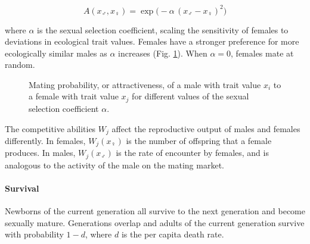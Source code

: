 \begin{equation}
    A(x_{\male}, x_{\female}) = \exp{\big(-\alpha \, (x_{\male} - x_{\female})^2\big)}
    \label{eq:assortative_mating}
\end{equation}

where $\alpha$ is the sexual selection coefficient, scaling the sensitivity of females to deviations in ecological trait values. Females have a stronger preference for more ecologically similar males as $\alpha$ increases (Fig. \ref{fig:mating_probability}). When $\alpha = 0$, females mate at random.\\ 

\begin{figure}
    \begin{center}
        \end{center}
    \label{fig:mating_probability}
    \caption{Mating probability, or attractiveness, of a male with trait value $x_i$ to a female with trait value $x_j$ for different values of the sexual selection coefficient $\alpha$.}
\end{figure}

The competitive abilities $W_j$ affect the reproductive output of males and females differently. In females, $W_j(x_{\female})$ is the number of offspring that a female produces. In males, $W_j(x_{\male})$ is the rate of encounter by females, and is analogous to the activity of the male on the mating market.

\paragraph{Survival} Newborns of the current generation all survive to the next generation and become sexually mature. Generations overlap and adults of the current generation survive with probability $1-d$, where $d$ is the per capita death rate.

